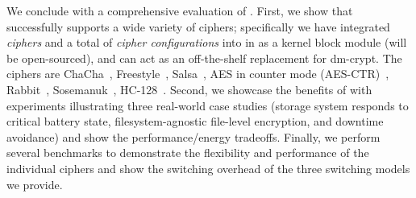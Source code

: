 We conclude with a comprehensive evaluation of \sys.
%
First, we show that \sys successfully supports a wide variety of ciphers;
specifically we have integrated {\em \numCiphers ciphers} and a total of {\em
\numConfigs cipher configurations} into \sys in \locTotal as a kernel block
module (will be open-sourced), and can act as an off-the-shelf replacement for
dm-crypt. The ciphers are ChaCha~\cite{ChaCha20}, Freestyle~\cite{Freestyle},
Salsa~\cite{SalsaX}, AES in counter mode (AES-CTR)~\cite{AESCTR},
Rabbit~\cite{Rabbit}, Sosemanuk~\cite{Sosemanuk}, HC-128~\cite{HC128}.
%
Second, we showcase the benefits of \sys with experiments illustrating three
real-world case studies (\ie storage system responds to critical battery state,
filesystem-agnostic file-level encryption, and downtime avoidance) and show the
performance/energy tradeoffs.
%
Finally, we perform several benchmarks to demonstrate the flexibility and
performance of the individual ciphers and show the switching overhead of the
three switching models we provide.
